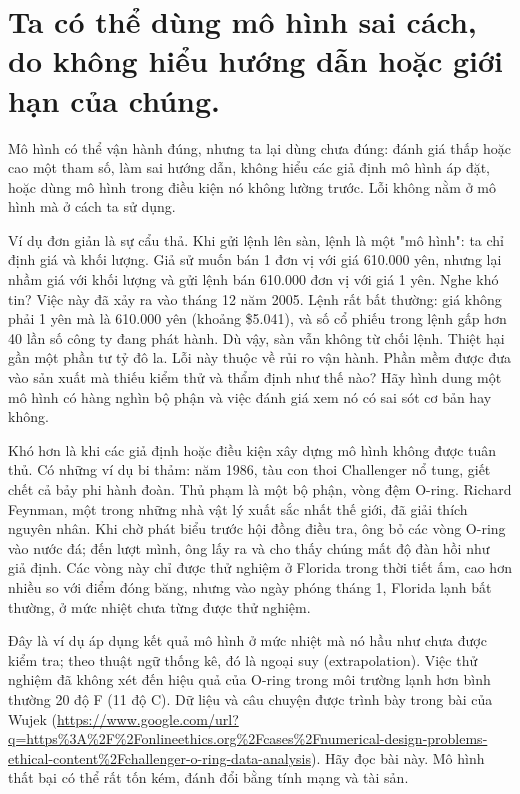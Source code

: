 \section{Ta có thể dùng mô hình sai cách, do không hiểu hướng dẫn hoặc giới hạn của chúng.}

Mô hình có thể vận hành đúng, nhưng ta lại dùng chưa đúng: đánh giá thấp hoặc cao một tham số, làm sai hướng dẫn, không hiểu các giả định mô hình áp đặt, hoặc dùng mô hình trong điều kiện nó không lường trước. Lỗi không nằm ở mô hình mà ở cách ta sử dụng.

Ví dụ đơn giản là sự cẩu thả. Khi gửi lệnh lên sàn, lệnh là một "mô hình": ta chỉ định giá và khối lượng. Giả sử muốn bán 1 đơn vị với giá 610.000 yên, nhưng lại nhầm giá với khối lượng và gửi lệnh bán 610.000 đơn vị với giá 1 yên. Nghe khó tin? Việc này đã xảy ra vào tháng 12 năm 2005. Lệnh rất bất thường: giá không phải 1 yên mà là 610.000 yên (khoảng \$5.041), và số cổ phiếu trong lệnh gấp hơn 40 lần số công ty đang phát hành. Dù vậy, sàn vẫn không từ chối lệnh. Thiệt hại gần một phần tư tỷ đô la. Lỗi này thuộc về rủi ro vận hành. Phần mềm được đưa vào sản xuất mà thiếu kiểm thử và thẩm định như thế nào? Hãy hình dung một mô hình có hàng nghìn bộ phận và việc đánh giá xem nó có sai sót cơ bản hay không.

Khó hơn là khi các giả định hoặc điều kiện xây dựng mô hình không được tuân thủ. Có những ví dụ bi thảm: năm 1986, tàu con thoi Challenger nổ tung, giết chết cả bảy phi hành đoàn. Thủ phạm là một bộ phận, vòng đệm O-ring. Richard Feynman, một trong những nhà vật lý xuất sắc nhất thế giới, đã giải thích nguyên nhân. Khi chờ phát biểu trước hội đồng điều tra, ông bỏ các vòng O-ring vào nước đá; đến lượt mình, ông lấy ra và cho thấy chúng mất độ đàn hồi như giả định. Các vòng này chỉ được thử nghiệm ở Florida trong thời tiết ấm, cao hơn nhiều so với điểm đóng băng, nhưng vào ngày phóng tháng 1, Florida lạnh bất thường, ở mức nhiệt chưa từng được thử nghiệm.

Đây là ví dụ áp dụng kết quả mô hình ở mức nhiệt mà nó hầu như chưa được kiểm tra; theo thuật ngữ thống kê, đó là ngoại suy (extrapolation). Việc thử nghiệm đã không xét đến hiệu quả của O-ring trong môi trường lạnh hơn bình thường 20 độ F (11 độ C). Dữ liệu và câu chuyện được trình bày trong bài của Wujek (\url{https://www.google.com/url?q=https\%3A\%2F\%2Fonlineethics.org\%2Fcases\%2Fnumerical-design-problems-ethical-content\%2Fchallenger-o-ring-data-analysis}). Hãy đọc bài này. Mô hình thất bại có thể rất tốn kém, đánh đổi bằng tính mạng và tài sản.

